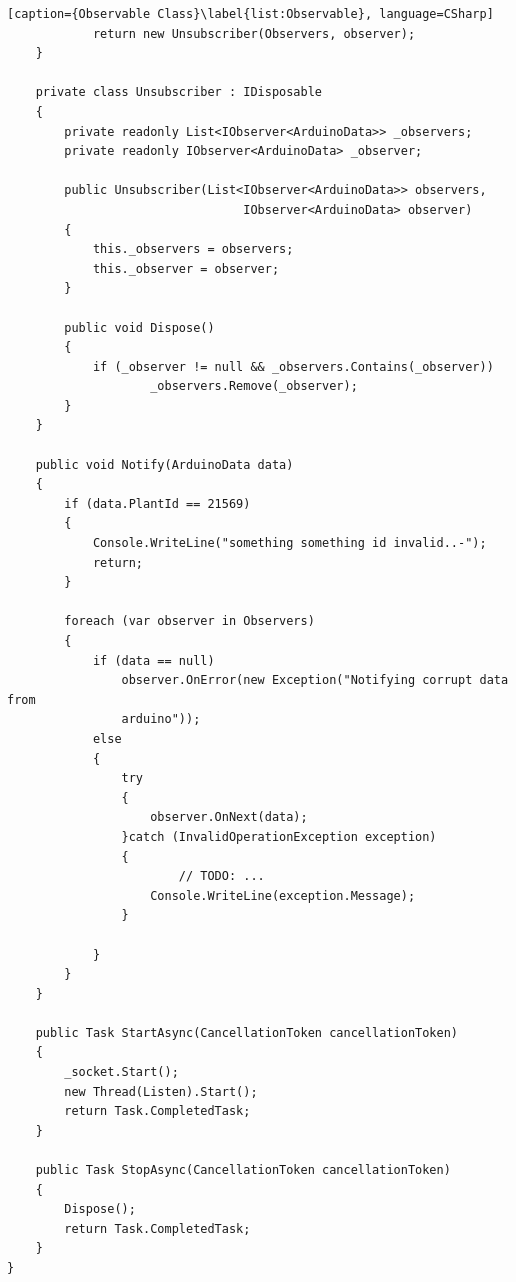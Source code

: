 \documentclass[a4paper,12pt,oneside,openright,titlepage]{book}
\begin{document}
\begin{lstlisting}[caption={Observable Class}\label{list:Observable}, language=CSharp]
            return new Unsubscriber(Observers, observer);
    }

	private class Unsubscriber : IDisposable
	{
		private readonly List<IObserver<ArduinoData>> _observers;
	    private readonly IObserver<ArduinoData> _observer;

        public Unsubscriber(List<IObserver<ArduinoData>> observers,
        						 IObserver<ArduinoData> observer)
		{
			this._observers = observers;
			this._observer = observer;
		}
		
		public void Dispose()
		{
			if (_observer != null && _observers.Contains(_observer))
					_observers.Remove(_observer);
        }
	}

	public void Notify(ArduinoData data)
	{
		if (data.PlantId == 21569)
		{
			Console.WriteLine("something something id invalid..-");
            return;
		}
            
		foreach (var observer in Observers)
		{
			if (data == null)
				observer.OnError(new Exception("Notifying corrupt data from
				arduino"));
			else
			{
				try
				{
					observer.OnNext(data);
				}catch (InvalidOperationException exception)
				{
                        // TODO: ...
					Console.WriteLine(exception.Message);
				}

			}
		}
	}

	public Task StartAsync(CancellationToken cancellationToken)
	{
		_socket.Start();
	    new Thread(Listen).Start();
        return Task.CompletedTask;
	}

	public Task StopAsync(CancellationToken cancellationToken)
	{
		Dispose();
	    return Task.CompletedTask;
    }
}
\end{lstlisting}
\end{document}
